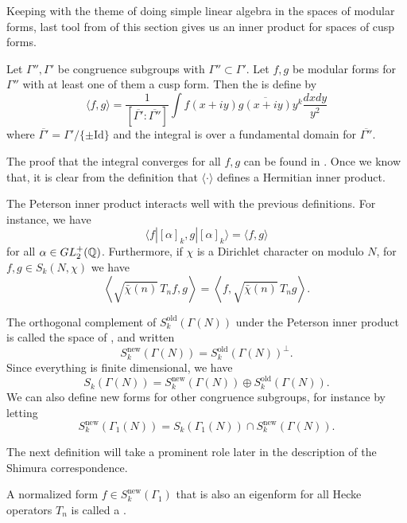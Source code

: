 \documentclass[12pt, a4paper]{report}
\begin{document}
Keeping with the theme of doing simple linear algebra in the spaces of modular
forms, last tool from of this section gives us an inner product for spaces
of cusp forms.

\begin{defn}
  Let $\Gamma'', \Gamma'$ be congruence subgroups with $\Gamma'' \subset
  \Gamma'$.
  Let $f, g$ be modular forms for $\Gamma''$ with at least one of them a cusp
  form. Then the  is define by
  \[\langle f,g \rangle = \frac{1}{[\overline{\Gamma'} : \overline{\Gamma''}]}
  \int f(x+iy) \overline{g(x+iy)} y^k \frac{dx dy}{y^2}\]
  where $\overline{\Gamma'} = \Gamma' / \{ \pm\text{Id}\}$ and the integral is over
  a fundamental domain for $\overline{\Gamma''}$.

  The proof that the integral converges for all $f, g$ can be found in
  \cite[Chapter III-5, page 170]{koblitz}. Once we know that, it is clear from
  the definition that $\langle \cdot \rangle$ defines a Hermitian inner product.
\end{defn}

The Peterson inner product interacts well with the previous definitions. For
instance, we have
\[\langle f | [\alpha]_k, g | [\alpha]_k \rangle = \langle f,g \rangle\]
for all $\alpha \in GL_2^+({\mathbb Q})$. Furthermore, if $\chi$ is a Dirichlet
character on modulo $N$, for $f,g \in S_k(N, \chi)$ we have
\[\left\langle \sqrt{\bar{\chi}(n)} \,T_n f, g \right\rangle = 
\left\langle f, \sqrt{\bar{\chi}(n)}\, T_n g \right\rangle.\]

\begin{defn}
  The orthogonal complement of $S_k^{\text{old}}(\Gamma(N))$ under the Peterson
  inner product is called the space of , and
  written
  \[S_k^{\text{new}}(\Gamma(N)) = S_k^{\text{old}}(\Gamma(N))^\perp.\]
  Since everything is finite dimensional, we have
  \[S_k(\Gamma(N)) = S_k^{\text{new}}(\Gamma(N)) \oplus S_k^{\text{old}}(\Gamma(N)).\]
  We can also define new forms for other congruence subgroups, for instance by
  letting
  \[S_k^{\text{new}}(\Gamma_1(N)) = S_k(\Gamma_1(N)) \cap
  S_k^{\text{new}}(\Gamma(N)).\]
\end{defn}

The next definition will take a prominent role later in the description of the
Shimura correspondence.

\begin{defn}
  A normalized form $f \in S_k^{\text{new}}(\Gamma_1)$ that is also an eigenform for all
  Hecke operators $T_n$ is called a . 
\end{defn}
\end{document}
